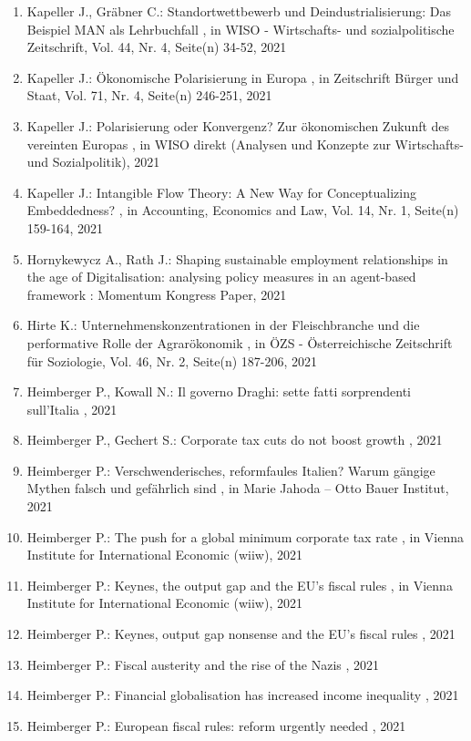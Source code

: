 \begin{enumerate}[leftmargin=*, labelsep=0.5cm]
	 \item Kapeller J., Gräbner C.:  Standortwettbewerb und Deindustrialisierung: Das Beispiel MAN als Lehrbuchfall  , in WISO - Wirtschafts- und sozialpolitische Zeitschrift, Vol. 44, Nr. 4, Seite(n) 34-52, 2021
	 \item Kapeller J.:  Ökonomische Polarisierung in Europa  , in Zeitschrift Bürger und Staat, Vol. 71, Nr. 4, Seite(n) 246-251, 2021
	 \item Kapeller J.:  Polarisierung oder Konvergenz? Zur ökonomischen Zukunft des vereinten Europas  , in WISO direkt (Analysen und Konzepte zur Wirtschafts- und Sozialpolitik), 2021
	 \item Kapeller J.:  Intangible Flow Theory: A New Way for Conceptualizing Embeddedness?  , in Accounting, Economics and Law, Vol. 14, Nr. 1, Seite(n) 159-164, 2021
	 \item Hornykewycz A., Rath J.:  Shaping sustainable employment relationships in the age of Digitalisation: analysing policy measures in an agent-based framework  : Momentum Kongress Paper, 2021
	 \item Hirte K.:  Unternehmenskonzentrationen in der Fleischbranche und die performative Rolle der Agrarökonomik  , in ÖZS - Österreichische Zeitschrift für Soziologie, Vol. 46, Nr. 2, Seite(n) 187-206, 2021
	 \item Heimberger P., Kowall N.:  Il governo Draghi: sette fatti sorprendenti sull’Italia  , 2021
	 \item Heimberger P., Gechert S.:  Corporate tax cuts do not boost growth  , 2021
	 \item Heimberger P.:  Verschwenderisches, reformfaules Italien? Warum gängige Mythen falsch und gefährlich sind  , in Marie Jahoda – Otto Bauer Institut, 2021
	 \item Heimberger P.:  The push for a global minimum corporate tax rate  , in Vienna Institute for International Economic (wiiw), 2021
	 \item Heimberger P.:  Keynes, the output gap and the EU’s fiscal rules  , in Vienna Institute for International Economic (wiiw), 2021
	 \item Heimberger P.:  Keynes, output gap nonsense and the EU’s fiscal rules  , 2021
	 \item Heimberger P.:  Fiscal austerity and the rise of the Nazis  , 2021
	 \item Heimberger P.:  Financial globalisation has increased income inequality  , 2021
	 \item Heimberger P.:  European fiscal rules: reform urgently needed  , 2021

\end{enumerate}

